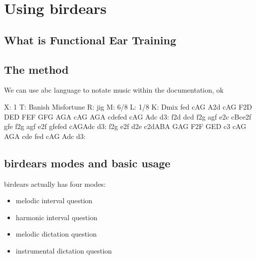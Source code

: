 \documentclass[letterpaper,10pt,english]{sphinxmanual}
\begin{document}
\chapter{Using birdears}
\label{\detokenize{using:using-birdears}}\label{\detokenize{using::doc}}

\section{What is Functional Ear Training}
\label{\detokenize{using:what-is-functional-ear-training}}


\section{The method}
\label{\detokenize{using:the-method}}
We can use abc language to notate music within the documentation, ok

\begin{sphinxVerbatim}[commandchars=\\\{\}]
X: 1
T: Banish Misfortune
R: jig
M: 6/8
L: 1/8
K: Dmix
fed cAG\textbar{} A2d cAG\textbar{} F2D DED\textbar{} FEF GFG\textbar{}
AGA cAG\textbar{} AGA cde\textbar{}fed cAG\textbar{} Ad\PYGZca{}c d3:\textbar{}
f2d d\PYGZca{}cd\textbar{} f2g agf\textbar{} e2c cBc\textbar{}e2f gfe\textbar{}
f2g agf\textbar{} e2f gfe\textbar{}fed cAG\textbar{}Ad\PYGZca{}c d3:\textbar{}
f2g e2f\textbar{} d2e c2d\textbar{}ABA GAG\textbar{} F2F GED\textbar{}
c3 cAG\textbar{} AGA cde\textbar{} fed cAG\textbar{} Ad\PYGZca{}c d3:\textbar{}
\end{sphinxVerbatim}


\section{birdears modes and basic usage}
\label{\detokenize{using:birdears-modes-and-basic-usage}}
birdears actually has four modes:
\begin{itemize}
\item {} 
melodic interval question

\item {} 
harmonic interval question

\item {} 
melodic dictation question

\item {} 
instrumental dictation question

\end{itemize}
\end{document}
